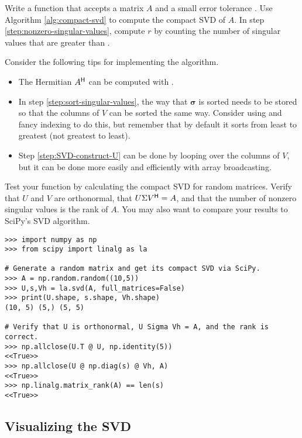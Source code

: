 \begin{problem} %
Write a function that accepts a matrix $A$ and a small error tolerance .
Use Algorithm \ref{alg:compact-svd} to compute the compact SVD of $A$.
In step \ref{step:nonzero-singular-values}, compute $r$ by counting the number of singular values that are greater than .

Consider the following tips for implementing the algorithm.
\begin{itemize}
    \item The Hermitian $A^{\mathsf H}$ can be computed with .
    \item In step \ref{step:sort-singular-values}, the way that $\boldsymbol{\sigma}$ is sorted needs to be stored so that the columns of $V$ can be sorted the same way.
    Consider using  and fancy indexing to do this, but remember that by default it sorts from least to greatest (not greatest to least).
    \item Step \ref{step:SVD-construct-U} can be done by looping over the columns of $V$, but it can be done more easily and efficiently with array broadcasting.
\end{itemize}

Test your function by calculating the compact SVD for random matrices.
Verify that $U$ and $V$ are orthonormal, that $U\Sigma V^{\mathsf H} = A$, and that the number of nonzero singular values is the rank of $A$.
You may also want to compare your results to SciPy's SVD algorithm.
%
\begin{lstlisting}
>>> import numpy as np
>>> from scipy import linalg as la

# Generate a random matrix and get its compact SVD via SciPy.
>>> A = np.random.random((10,5))
>>> U,s,Vh = la.svd(A, full_matrices=False)
>>> print(U.shape, s.shape, Vh.shape)
(10, 5) (5,) (5, 5)

# Verify that U is orthonormal, U Sigma Vh = A, and the rank is correct.
>>> np.allclose(U.T @ U, np.identity(5))
<<True>>
>>> np.allclose(U @ np.diag(s) @ Vh, A)
<<True>>
>>> np.linalg.matrix_rank(A) == len(s)
<<True>>
\end{lstlisting}
\label{prob:calculate-compact-svd}
\end{problem}

\subsection*{Visualizing the SVD} %

